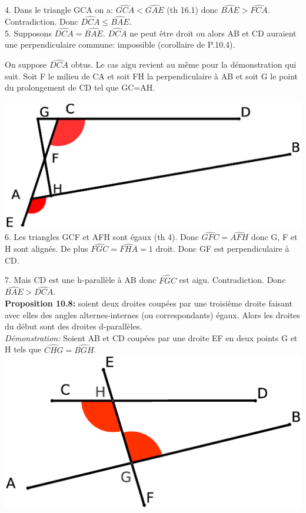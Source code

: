 \documentclass[a4paper, 12pt, twoside]{book}
\begin{document}
   4. Dans le triangle GCA on a: $\hat{GCA}<\hat{GAE}$ (th 16.1) donc  $\hat{BAE}>\hat{FCA}$. Contradiction. Donc $\hat{DCA}\leq\hat{BAE}$.\\
   
   
   5. Supposons $\hat{DCA}=\hat{BAE}$. $\hat{DCA}$ ne peut être droit ou alors AB et CD auraient une perpendiculaire commune: impossible (corollaire de P.10.4).\
   
   On suppose $\hat{DCA}$ obtus. Le cas aigu revient au même pour la démonstration qui suit. Soit F le milieu de CA et soit FH la perpendiculaire à AB et soit G le point du prolongement de CD tel que GC=AH.\
   
   \includegraphics[scale=0.4]{figures/Lobat14.eps}\\
   
   6. Les triangles GCF et AFH sont égaux (th 4). Donc $\hat{GFC}=\hat{AFH}$ donc G, F et H sont alignés. De plus $\hat{FGC}=\hat{FHA}=1$ droit. Donc GF est perpendiculaire à CD.\
   
   7. Mais CD est une h-parallèle à AB donc  $\hat{FGC}$ est aigu. Contradiction. Donc $\hat{BAE}>\hat{DCA}$.\\
   
   
   
    
  \textbf{Proposition 10.8:} soient deux droites coupées par une troisième droite faisant avec elles des angles alternes-internes (ou correspondants) égaux. Alors les droites du début sont des droites d-parallèles.\\
 
 \textit{Démonstration:} Soient AB et CD coupées par une droite EF en deux points G et H tels que $\hat{CHG}=\hat{BGH}$.\\
 
  
  
 \includegraphics[scale=0.4]{figures/Lobat15.eps}\\ 
 
\end{document}
